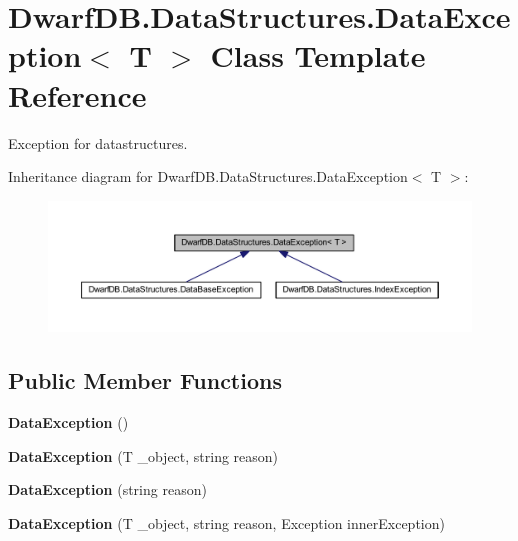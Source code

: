 \hypertarget{class_dwarf_d_b_1_1_data_structures_1_1_data_exception-g}{
\section{DwarfDB.DataStructures.DataException$<$ T $>$ Class Template Reference}
\label{class_dwarf_d_b_1_1_data_structures_1_1_data_exception-g}
}


Exception for datastructures.  




Inheritance diagram for DwarfDB.DataStructures.DataException$<$ T $>$:
\nopagebreak
\begin{figure}[H]
\begin{center}
\leavevmode
\includegraphics[width=400pt]{class_dwarf_d_b_1_1_data_structures_1_1_data_exception-g__inherit__graph}
\end{center}
\end{figure}
\subsection*{Public Member Functions}
\begin{DoxyCompactItemize}
\item 
\hypertarget{class_dwarf_d_b_1_1_data_structures_1_1_data_exception-g_a55aaebcbf174a46e4172fb5f01b421b3}{
{\bfseries DataException} ()}
\label{class_dwarf_d_b_1_1_data_structures_1_1_data_exception-g_a55aaebcbf174a46e4172fb5f01b421b3}

\item 
\hypertarget{class_dwarf_d_b_1_1_data_structures_1_1_data_exception-g_af4387a96920d83cb65d7e3f16e8722e3}{
{\bfseries DataException} (T \_\-object, string reason)}
\label{class_dwarf_d_b_1_1_data_structures_1_1_data_exception-g_af4387a96920d83cb65d7e3f16e8722e3}

\item 
\hypertarget{class_dwarf_d_b_1_1_data_structures_1_1_data_exception-g_ad5c6e96cce65e0b685f01cb18e97360a}{
{\bfseries DataException} (string reason)}
\label{class_dwarf_d_b_1_1_data_structures_1_1_data_exception-g_ad5c6e96cce65e0b685f01cb18e97360a}

\item 
\hypertarget{class_dwarf_d_b_1_1_data_structures_1_1_data_exception-g_a800b1e19b9ca32978883d206a8c9683e}{
{\bfseries DataException} (T \_\-object, string reason, Exception innerException)}
\label{class_dwarf_d_b_1_1_data_structures_1_1_data_exception-g_a800b1e19b9ca32978883d206a8c9683e}

\end{DoxyCompactItemize}
